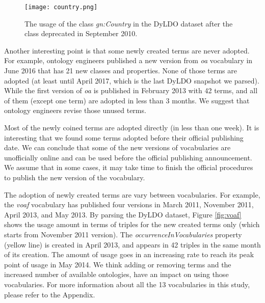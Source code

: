\begin{figure}
	\centering
	\texttt{[image: country.png]}
	\caption{The usage of the class \textit{gn:Country} in the DyLDO dataset after the class deprecated in September 2010.}
	\label{fig:country}
\end{figure}

Another interesting point is that some newly created terms are never adopted. For example, ontology engineers published a new version from \textit{oa} vocabulary in June 2016 that has 21 new classes and properties. None of those terms are adopted (at least until April 2017, which is the last DyLDO snapshot we parsed). While the first version of \textit{oa} is published in February 2013 with 42 terms, and all of them (except one term) are adopted in less than 3 months. We suggest that ontology engineers revise those unused terms. 

Most of the newly coined terms are adopted directly (in less than one week). It is interesting that we found some terms adopted before their official publishing date. We can conclude that some of the new versions of vocabularies are unofficially online and can be used before the official publishing announcement. We assume that in some cases, it may take time to finish the official procedures to publish the new version of the vocabulary.

The adoption of newly created terms are vary between vocabularies.
For example, the \textit{voaf} vocabulary has published four versions in March 2011, November 2011, April 2013, and May 2013. By parsing the DyLDO dataset, Figure \ref{fig:voaf} shows the usage amount in terms of triples for the new created terms only (which starts from November 2011 version). The \textit{occurrenceInVocabularies} property (yellow line) is created in April 2013, and appears in 42 triples in the same month of its creation. The amount of usage goes in an increasing rate to reach its peak point of usage in May 2014. We think adding or removing terms and the increased number of available ontologies, have an impact on using those vocabularies. For more information about all the 13 vocabularies in this study, please refer to the Appendix.

